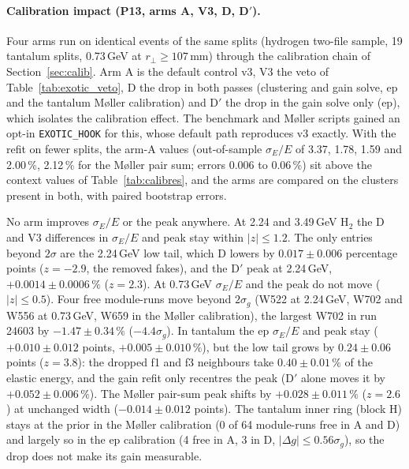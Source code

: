\documentclass[11pt]{article}
\newcommand{\code}[1]{\texttt{#1}}
\begin{document}
\paragraph{Calibration impact (P13, arms A, V3, D, D$'$).} Four arms run on identical events of the same splits (hydrogen two-file sample, 19 tantalum splits, 0.73\,GeV at $r_\perp \ge 107$\,mm) through the calibration chain of Section~\ref{sec:calib}. Arm A is the default control v3, V3 the veto of Table~\ref{tab:exotic_veto}, D the drop in both passes (clustering and gain solve, ep and the tantalum M\o ller calibration) and D$'$ the drop in the gain solve only (ep), which isolates the calibration effect. The benchmark and M\o ller scripts gained an opt-in \code{EXOTIC\_HOOK} for this, whose default path reproduces v3 exactly. With the refit on fewer splits, the arm-A values (out-of-sample $\sigma_E/E$ of 3.37, 1.78, 1.59 and 2.00\,\%, 2.12\,\% for the M\o ller pair sum; errors 0.006 to 0.06\,\%) sit above the context values of Table~\ref{tab:calibres}, and the arms are compared on the clusters present in both, with paired bootstrap errors.

No arm improves $\sigma_E/E$ or the peak anywhere. At 2.24 and 3.49\,GeV H$_2$ the D and V3 differences in $\sigma_E/E$ and peak stay within $|z| \le 1.2$. The only entries beyond $2\sigma$ are the 2.24\,GeV low tail, which D lowers by $0.017 \pm 0.006$ percentage points ($z = -2.9$, the removed fakes), and the D$'$ peak at 2.24\,GeV, $+0.0014 \pm 0.0006\,\%$ ($z = 2.3$). At 0.73\,GeV $\sigma_E/E$ and the peak do not move ($|z| \le 0.5$). Four free module-runs move beyond $2\sigma_g$ (W522 at 2.24\,GeV, W702 and W556 at 0.73\,GeV, W659 in the M\o ller calibration), the largest W702 in run 24603 by $-1.47 \pm 0.34\,\%$ ($-4.4\sigma_g$). In tantalum the ep $\sigma_E/E$ and peak stay ($+0.010 \pm 0.012$ points, $+0.005 \pm 0.010\,\%$), but the low tail grows by $0.24 \pm 0.06$ points ($z = 3.8$): the dropped f1 and f3 neighbours take $0.40 \pm 0.01\,\%$ of the elastic energy, and the gain refit only recentres the peak (D$'$ alone moves it by $+0.052 \pm 0.006\,\%$). The M\o ller pair-sum peak shifts by $+0.028 \pm 0.011\,\%$ ($z = 2.6$) at unchanged width ($-0.014 \pm 0.012$ points). The tantalum inner ring (block H) stays at the prior in the M\o ller calibration (0 of 64 module-runs free in A and D) and largely so in the ep calibration (4 free in A, 3 in D, $|\Delta g| \le 0.56\sigma_g$), so the drop does not make its gain measurable.
\end{document}
